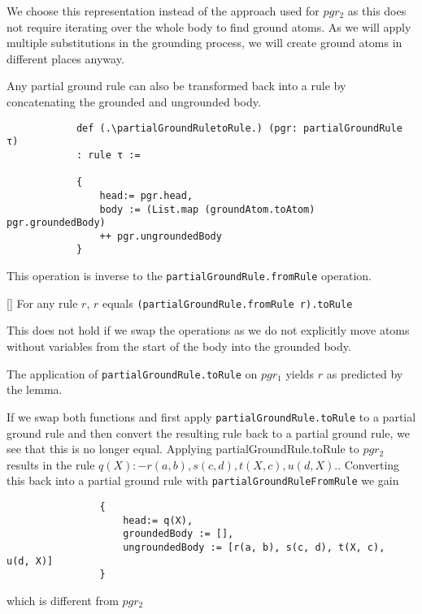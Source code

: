         We choose this representation instead of the approach used for $pgr_2$ as this does not require iterating over the whole body to find ground atoms. As we will apply multiple substitutions in the grounding process, we will create ground atoms in different places anyway.

        Any partial ground rule can also be transformed back into a rule by concatenating the grounded and ungrounded body.

        \begin{lstlisting}
            def (.\partialGroundRuletoRule.) (pgr: partialGroundRule τ)
            : rule τ :=
    
            {
                head:= pgr.head, 
                body := (List.map (groundAtom.toAtom) pgr.groundedBody)
                ++ pgr.ungroundedBody
            }
        \end{lstlisting}
        
        This operation is inverse to the \lstinline|partialGroundRule.fromRule| operation.

        \begin{lemma}\label{lem:toRuleFromRuleInv}[\partialGroundRuleToRuleInverseToFromRule]
            For any rule $r$, $r$ equals \lstinline|(partialGroundRule.fromRule r).toRule|
        \end{lemma}

        This does not hold if we swap the operations as we do not explicitly move atoms without variables from the start of the body into the grounded body.

        \begin{example}
            The application of \texttt{partialGroundRule.toRule} on $pgr_1$ yields $r$ as predicted by the lemma.

            If we swap both functions and first apply \texttt{partialGroundRule.toRule} to a partial ground rule and then convert the resulting rule back to a partial ground rule, we see that this is no longer equal. Applying {partialGroundRule.toRule} to $pgr_2$ results in the rule $ q(X) :- r(a, b), s(c, d), t(X, c),  u(d, X) . $. Converting this back into a partial ground rule with \texttt{partialGroundRuleFromRule} we gain 

            \begin{lstlisting}
                {
                    head:= q(X),
                    groundedBody := [],
                    ungroundedBody := [r(a, b), s(c, d), t(X, c),  u(d, X)]
                }
            \end{lstlisting}
            which is different from $pgr_2$
        \end{example}

